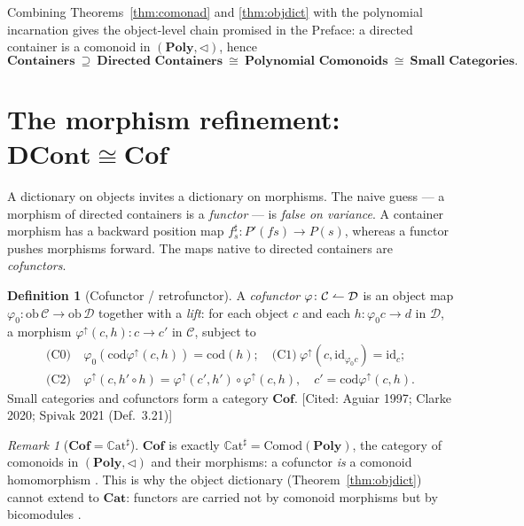 \documentclass[11pt,a4paper]{book}
\newcommand{\Cat}{\mathbf{Cat}}
\newcommand{\Cof}{\mathbf{Cof}}
\newcommand{\DCont}{\mathbf{DCont}}
\newcommand{\Poly}{\mathbf{Poly}}
\newcommand{\id}{\mathrm{id}}
\newcommand{\cod}{\mathrm{cod}}
\newcommand{\ob}{\mathrm{ob}\,}
\newcommand{\co}{\mathrel{\text{\reflectbox{$\rightharpoonup$}}}}
\newcommand{\Cathash}{\mathbb{C}\mathrm{at}^\sharp}
\theoremstyle{plain}
\theoremstyle{definition}
\newtheorem{Definition}[Theorem]{Definition}
\theoremstyle{remark}
\newtheorem{Remark}[Theorem]{Remark}
\newcommand{\prov}[1]{\hfill\textsf{\footnotesize[#1]}}
\begin{document}
Combining Theorems~\ref{thm:comonad} and \ref{thm:objdict} with the polynomial
incarnation gives the object-level chain promised in the Preface: a directed
container is a comonoid in $(\Poly,\triangleleft)$, hence
\[
  \textbf{Containers}\ \supseteq\ \textbf{Directed Containers}
  \ \cong\ \textbf{Polynomial Comonoids}\ \cong\ \textbf{Small Categories}.
\]

\section{The morphism refinement: \texorpdfstring{$\DCont\cong\Cof$}{DCont = Cof}}

A dictionary on objects invites a dictionary on morphisms. The naive guess --- a
morphism of directed containers is a \emph{functor} --- is \emph{false on
variance}. A container morphism has a backward position map
$f^\sharp_s\colon P'(fs)\to P(s)$, whereas a functor pushes morphisms forward. The
maps native to directed containers are \emph{cofunctors}.

\begin{Definition}[Cofunctor / retrofunctor]\label{def:cofunctor}
A \emph{cofunctor} $\varphi\colon\mathcal C\co\mathcal D$ is an object map
$\varphi_0\colon\ob\mathcal C\to\ob\mathcal D$ together with a \emph{lift}: for each
object $c$ and each $h\colon\varphi_0 c\to d$ in $\mathcal D$, a morphism
$\varphi^\uparrow(c,h)\colon c\to c'$ in $\mathcal C$, subject to
\begin{align*}
  \text{(C0)}\ & \varphi_0(\cod\varphi^\uparrow(c,h))=\cod(h);\quad
  \text{(C1)}\ \varphi^\uparrow(c,\id_{\varphi_0 c})=\id_c;\\
  \text{(C2)}\ & \varphi^\uparrow(c,h'\circ h)=\varphi^\uparrow(c',h')\circ
        \varphi^\uparrow(c,h),\quad c'=\cod\varphi^\uparrow(c,h).
\end{align*}
Small categories and cofunctors form a category $\Cof$.
\prov{Cited: Aguiar 1997; Clarke 2020; Spivak 2021 (Def.\ 3.21)}
\end{Definition}

\begin{Remark}[$\Cof=\Cathash$]
$\Cof$ is exactly $\Cathash=\mathrm{Comod}(\Poly)$, the category of comonoids in
$(\Poly,\triangleleft)$ and their morphisms: a cofunctor \emph{is} a comonoid
homomorphism \cite{Spivak21,SS2405}. This is why the object dictionary
(Theorem~\ref{thm:objdict}) cannot extend to $\Cat$: functors are carried not by
comonoid morphisms but by bicomodules \cite{SS23}.
\end{Remark}
\end{document}
